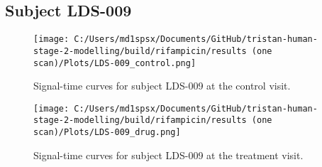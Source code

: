 \documentclass{epflreport}%
\begin{document}
\subsection{Subject LDS{-}009}%
\label{subsec:SubjectLDS{-}009}%

%


\begin{figure}[h!]%
\centering%
\texttt{[image: C:/Users/md1spsx/Documents/GitHub/tristan-human-stage-2-modelling/build/rifampicin/results (one scan)/Plots/LDS-009\_control.png]}%
\caption{Signal{-}time curves for subject LDS{-}009 at the control visit.}%
\end{figure}

%


\begin{figure}[h!]%
\centering%
\texttt{[image: C:/Users/md1spsx/Documents/GitHub/tristan-human-stage-2-modelling/build/rifampicin/results (one scan)/Plots/LDS-009\_drug.png]}%
\caption{Signal{-}time curves for subject LDS{-}009 at the treatment visit.}%
\end{figure}
\end{document}
